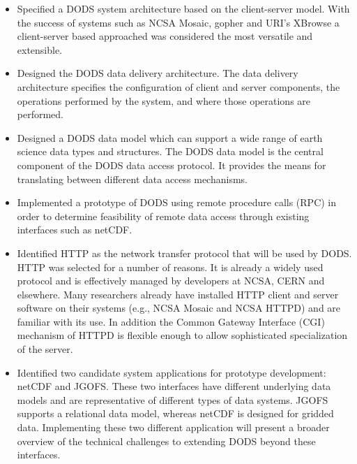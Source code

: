 \begin{itemize}
 
   \item Specified a DODS system architecture based on the client-server
     model.  With the success of systems such as NCSA Mosaic, gopher and URI's
     XBrowse a client-server based approached was considered the most
     versatile and extensible.  

   \item Designed the DODS data delivery architecture.  The data delivery
     architecture specifies the configuration of client and server
     components, the operations performed by the system, and where those
     operations are performed.

   \item Designed a DODS data model which can support a wide range of earth
     science data types and structures.  The DODS data model is the central
     component of the DODS data access protocol.  It provides the means for
     translating between different data access mechanisms.

   \item Implemented a prototype of DODS using remote procedure calls (RPC)
     in order to determine feasibility of remote data access through existing
     interfaces such as netCDF.

   \item Identified HTTP as the network transfer protocol that will be used
     by DODS.  HTTP was selected for a number of reasons.  It is already a
     widely used protocol and is effectively managed by developers at NCSA,
     CERN and elsewhere.  Many researchers already have installed HTTP client
     and server software on their systems (e.g., NCSA Mosaic and NCSA HTTPD)
     and are familiar with its use. In addition the Common Gateway
     Interface (CGI) mechanism of HTTPD is flexible enough to allow
     sophisticated specialization of the server.

   \item Identified two candidate system applications for prototype
     development: netCDF and JGOFS. These two interfaces have different
     underlying data models and are representative of different types of
     data systems.  JGOFS supports a relational data model, whereas netCDF is
     designed for gridded data.  Implementing these two different
     application will present a broader overview of the technical challenges
     to extending DODS beyond these interfaces.
\end{itemize}

